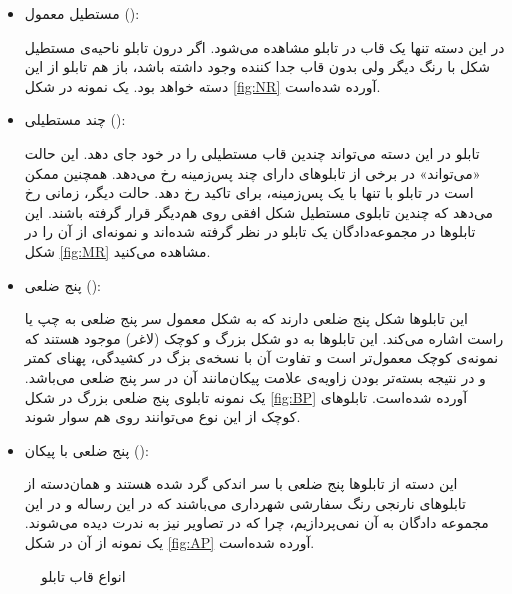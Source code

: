 \begin{itemize}
\renewcommand{\labelitemii}{$\circ$}

\item مستطیل معمول (): 

در این دسته تنها یک قاب در تابلو مشاهده می‌شود. اگر درون تابلو ناحیه‌ی مستطیل شکل با رنگ دیگر ولی بدون قاب جدا کننده وجود داشته باشد، باز هم تابلو از این دسته خواهد بود. یک نمونه در شکل \ref{fig:NR} آورده‌ شده‌است.

\item چند مستطیلی (): 

تابلو در این دسته می‌تواند چندین قاب مستطیلی را در خود جای‌ دهد. این حالت «می‌تواند» در برخی از تابلوهای دارای چند پس‌زمینه رخ می‌دهد. همچنین ممکن است در تابلو با تنها با یک پس‌زمینه، برای تاکید رخ دهد. حالت دیگر، زمانی رخ می‌دهد که چندین تابلوی مستطیل شکل افقی روی هم‌دیگر قرار گرفته باشند. این تابلوها در مجموعه‌دادگان یک تابلو در نظر گرفته شده‌اند و نمونه‌ای از آن‌ را در شکل \ref{fig:MR} مشاهده می‌کنید. 

\item پنج ضلعی (): 

این تابلوها شکل پنج ضلعی دارند که به شکل معمول سر پنج ضلعی به چپ یا راست اشاره می‌کند. این تابلوها به دو شکل بزرگ و کوچک (لاغر) موجود هستند که نمونه‌ی کوچک معمول‌تر است و تفاوت آن با نسخه‌ی بزگ در کشیدگی، پهنای کمتر و در نتیجه بسته‌تر بودن زاویه‌ی علامت پیکان‌مانند آن در سر پنج ضلعی می‌باشد. یک نمونه تابلوی پنج ضلعی بزرگ در شکل \ref{fig:BP} آورده شده‌است. تابلوهای کوچک از این نوع می‌توانند روی هم سوار شوند. 

\item پنج ضلعی با پیکان (): 

این دسته از تابلوها پنج ضلعی با سر اندکی گرد شده هستند و همان‌دسته از تابلوهای نارنجی رنگ سفارشی شهرداری می‌باشند که در این رساله و در این مجموعه دادگان به آن نمی‌پردازیم، چرا که در تصاویر نیز به ندرت دیده می‌شوند. یک نمونه از آن در شکل \ref{fig:AP} آورده شده‌است. 

\end{itemize}
 
 
\begin{figure}[ht]
\centering     %
{}\hspace{-2mm}
\hspace{-2mm}
\hspace{-2mm}
\hspace{-2mm}
\caption{انواع قاب تابلو}
\end{figure}


